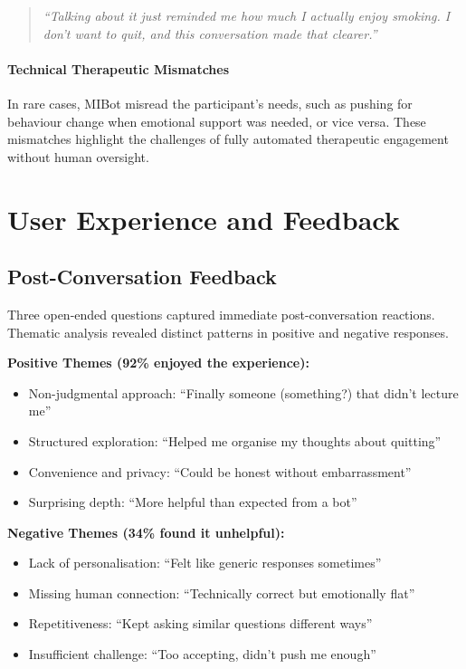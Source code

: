 \begin{quote}
\textit{``Talking about it just reminded me how much I actually enjoy smoking. I don't want to quit, and this conversation made that clearer.''}
\end{quote}

\paragraph{Technical Therapeutic Mismatches}
In rare cases, MIBot misread the participant's needs, such as pushing for behaviour change when emotional support was needed, or vice versa. These mismatches highlight the challenges of fully automated therapeutic engagement without human oversight.

\section{User Experience and Feedback}
\label{sec:feedback}

\subsection{Post-Conversation Feedback}

Three open-ended questions captured immediate post-conversation reactions. Thematic analysis revealed distinct patterns in positive and negative responses.

\textbf{Positive Themes (92\% enjoyed the experience):}
\begin{itemize}
\item Non-judgmental approach: ``Finally someone (something?) that didn't lecture me''
\item Structured exploration: ``Helped me organise my thoughts about quitting''
\item Convenience and privacy: ``Could be honest without embarrassment''
\item Surprising depth: ``More helpful than expected from a bot''
\end{itemize}

\textbf{Negative Themes (34\% found it unhelpful):}
\begin{itemize}
\item Lack of personalisation: ``Felt like generic responses sometimes''
\item Missing human connection: ``Technically correct but emotionally flat''
\item Repetitiveness: ``Kept asking similar questions different ways''
\item Insufficient challenge: ``Too accepting, didn't push me enough''
\end{itemize}

